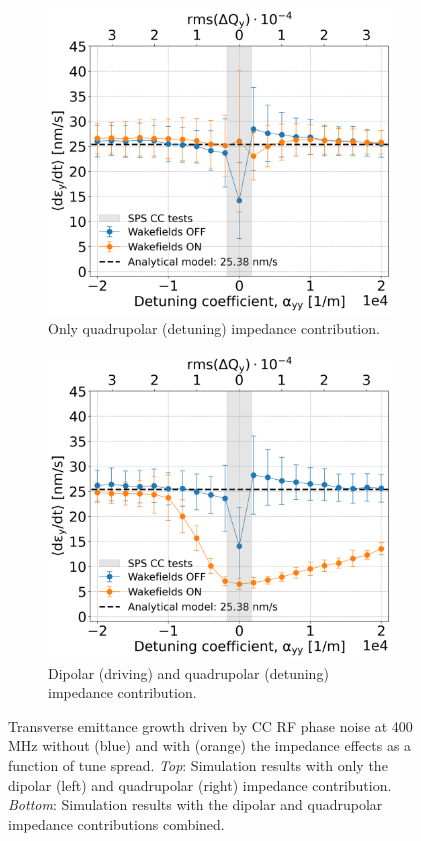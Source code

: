 \begin{figure}[htp]
\begin{subfigure}{.45\textwidth}
        \includegraphics[width=.95\linewidth]{images/Ch7/quadrupolar_impedance.png}
        \caption{Only quadrupolar (detuning) impedance contribution.}
        \label{fig:study_7_quad}
    \end{subfigure}
    \begin{subfigure}{.45\textwidth}
        \centering
        \includegraphics[width=.95\linewidth]{images/Ch7/deyRates_final_2018_PN_sps_270GeV_PN1e-8_400MHz_y-plane_QpxQpy5e-1_6D_Nb5e5_intensity3e10_ayyScan_wakesON_vs_OFF_vs_TuneSpreadvsExpectedSPS.png}  
        \caption{Dipolar (driving) and quadrupolar (detuning) impedance contribution.}
        \label{fig:study_7_dipole_and_quad}
    \end{subfigure}   
    \caption{Transverse emittance growth driven by CC RF phase noise at 400\,MHz without (blue) and with (orange) the impedance effects as a function of tune spread. \textit{Top}: Simulation results with only the dipolar (left) and quadrupolar (right) impedance contribution. \textit{Bottom}: Simulation results with the dipolar and quadrupolar impedance contributions combined.}
    \label{fig:study_7_dipole_vs_quadrupole}
\end{figure}

